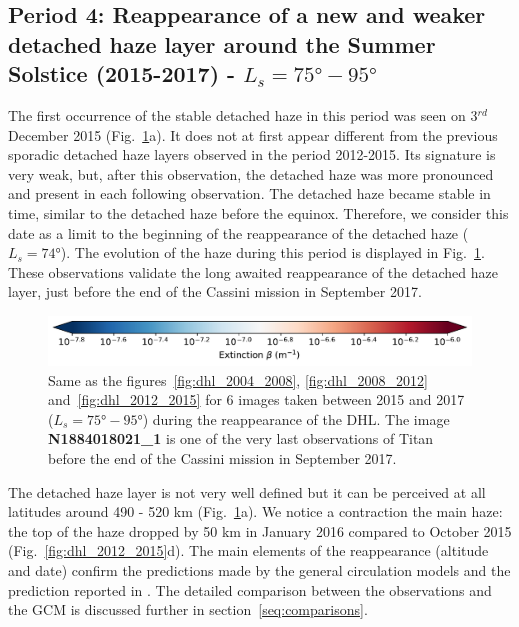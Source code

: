 \subsection{Period 4: Reappearance of a new and weaker detached haze layer around the Summer Solstice (2015-2017) - $L_s=\ang{75}-\ang{95}$}

The first occurrence of the stable detached haze in this period was seen on 3$^{rd}$ December 2015
(Fig.~\ref{fig:dhl_2015_2017}a). It
does not at first appear different from the previous sporadic detached haze layers observed in the period 2012-2015. Its signature is very weak, but, after
this observation, the detached haze was more pronounced and present in each following observation. The detached haze became stable in time,
similar to the detached haze before the equinox. Therefore, we consider this date as a limit to the beginning of the
reappearance of the detached haze ($L_s=\ang{74}$). The evolution of the haze during this period is displayed in
Fig.~\ref{fig:dhl_2015_2017}. These observations validate the long awaited reappearance of the detached haze layer,
just before the end of the Cassini mission in September 2017.

\begin{figure}[!ht]
\includegraphics[width=.5\textwidth]{Fig/Extinction_colorbar}
\caption{Same as the figures~\ref{fig:dhl_2004_2008}, \ref{fig:dhl_2008_2012}
and~\ref{fig:dhl_2012_2015} for 6 images taken between 2015 and 2017
($L_s=\ang{75}-\ang{95}$) during the reappearance of the DHL.
The image \textbf{N1884018021\_1} is one of the very last observations of Titan before
the end of the Cassini mission in September 2017.}
\label{fig:dhl_2015_2017}
\end{figure}

The detached haze layer is not very well defined but it can be perceived at all latitudes
around 490 - 520 km (Fig.~\ref{fig:dhl_2015_2017}a). We notice a contraction
the main haze: the top of the haze dropped by 50 km in January 2016 compared to October 2015
(Fig.~\ref{fig:dhl_2012_2015}d). The main elements of the reappearance (altitude and date) confirm the
predictions made by the general circulation models \citep{Lebonnois2012,Larson2015} and the prediction
reported in \cite{West2011}. The detailed comparison between the observations and the GCM is discussed further
in section~\ref{seq:comparisons}.

